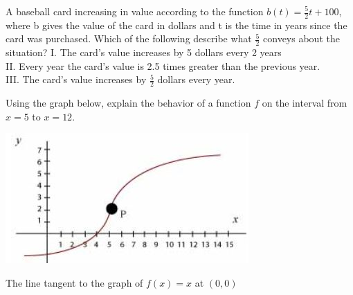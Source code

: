\documentclass{ximera}
\newcommand{\recommendation}[1]{}
\newcommand{\GoodQuestions}[1]{}
\newcommand{\PCA}[1]{}
\begin{document}
\begin{problem}
  \recommendation{Elizabeth}
  \PCA{\#22}

  A baseball card increasing in value according to the function
  $b(t)=\frac{5}{2}t+100$, where b gives the value of the card in
  dollars and t is the time in years since the card was purchased.
  Which of the following describe what $\frac{5}{2}$ conveys about the
  situation?
  I. The card's value increases by 5 dollars every 2 years\\
  II. Every year the card's value is 2.5 times greater than the previous year.\\
  III.  The card's value increases by $\frac{5}{2}$ dollars every year.
  \begin{multipleChoice}
  \end{multipleChoice}
\end{problem}


\begin{problem}
  \recommendation{Elizabeth}

  \PCA{\#19}

  Using the graph below, explain the behavior of a function $f$ on the
  interval from $x=5$ to $x=12$.
  \begin{image}
    \includegraphics[scale = 1]{rategraph}
  \end{image}
  \begin{multipleChoice}
  \end{multipleChoice}
\end{problem}


\begin{problem}
  \recommendation{Vic}
  \GoodQuestions{Subject: Tangents, velocities, and other rates of change 2P}
  The line tangent to the graph of $f(x)=x$ at $(0,0)$
  \begin{multipleChoice}
  \end{multipleChoice}
\end{problem}
\end{document}
